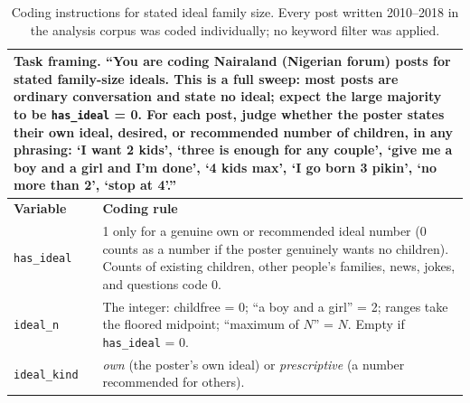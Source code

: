 
\begin{table}[t]
\centering
\footnotesize
\begin{tabular}{p{2.2cm}p{11.6cm}}
\toprule
\multicolumn{2}{p{13.8cm}}{\textbf{Task framing.} ``You are coding Nairaland
(Nigerian forum) posts for stated family-size ideals. This is a full sweep:
most posts are ordinary conversation and state no ideal; expect the large
majority to be \texttt{has\_ideal} = 0. For each post, judge whether the
poster states their own ideal, desired, or recommended number of children, in
any phrasing: `I want 2 kids', `three is enough for any couple', `give me a
boy and a girl and I'm done', `4 kids max', `I go born 3 pikin', `no more
than 2', `stop at 4'.''} \\
\midrule
\textbf{Variable} & \textbf{Coding rule} \\
\midrule
\texttt{has\_ideal} & 1 only for a genuine own or recommended ideal number
(0 counts as a number if the poster genuinely wants no children). Counts of
existing children, other people's families, news, jokes, and questions
code 0. \\
\addlinespace
\texttt{ideal\_n} & The integer: childfree = 0; ``a boy and a girl'' = 2;
ranges take the floored midpoint; ``maximum of $N$'' = $N$. Empty if
\texttt{has\_ideal} = 0. \\
\addlinespace
\texttt{ideal\_kind} & \textit{own} (the poster's own ideal) or
\textit{prescriptive} (a number recommended for others). \\
\bottomrule
\end{tabular}
\caption{Coding instructions for stated ideal family size. Every post written
2010--2018 in the analysis corpus was coded individually; no keyword filter
was applied.}
\label{tab:codebook_ideals}
\end{table}

